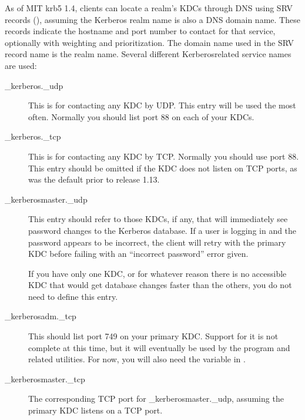 \documentclass[letterpaper,10pt,english]{sphinxmanual}
\begin{document}
\sphinxAtStartPar
As of MIT krb5 1.4, clients can locate a realm’s KDCs through DNS
using SRV records (), assuming the Kerberos realm name is
also a DNS domain name.  These records indicate the hostname and port
number to contact for that service, optionally with weighting and
prioritization.  The domain name used in the SRV record name is the
realm name.  Several different Kerberos\sphinxhyphen{}related service names are
used:
\begin{description}
\item[{\_kerberos.\_udp}] \leavevmode
\sphinxAtStartPar
This is for contacting any KDC by UDP.  This entry will be used
the most often.  Normally you should list port 88 on each of your
KDCs.

\item[{\_kerberos.\_tcp}] \leavevmode
\sphinxAtStartPar
This is for contacting any KDC by TCP.  Normally you should use
port 88.  This entry should be omitted if the KDC does not listen
on TCP ports, as was the default prior to release 1.13.

\item[{\_kerberos\sphinxhyphen{}master.\_udp}] \leavevmode
\sphinxAtStartPar
This entry should refer to those KDCs, if any, that will
immediately see password changes to the Kerberos database.  If a
user is logging in and the password appears to be incorrect, the
client will retry with the primary KDC before failing with an
“incorrect password” error given.

\sphinxAtStartPar
If you have only one KDC, or for whatever reason there is no
accessible KDC that would get database changes faster than the
others, you do not need to define this entry.

\item[{\_kerberos\sphinxhyphen{}adm.\_tcp}] \leavevmode
\sphinxAtStartPar
This should list port 749 on your primary KDC.  Support for it is
not complete at this time, but it will eventually be used by the
{\hyperref[\detokenize{admin/admin_commands/kadmin_local:kadmin-1}]{}} program and related utilities.  For now, you will
also need the  variable in {\hyperref[\detokenize{admin/conf_files/krb5_conf:krb5-conf-5}]{}}.

\item[{\_kerberos\sphinxhyphen{}master.\_tcp}] \leavevmode
\sphinxAtStartPar
The corresponding TCP port for \_kerberos\sphinxhyphen{}master.\_udp, assuming the
primary KDC listens on a TCP port.


\end{description}
\end{document}
